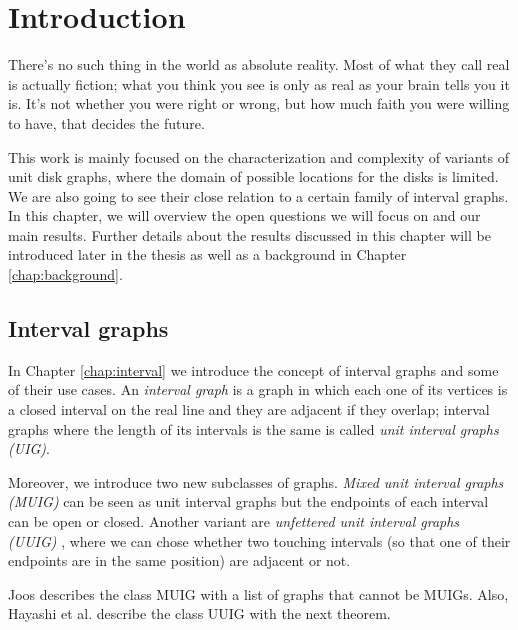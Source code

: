 \newtheorem*{_lemma}{Lemma}
\newtheorem*{_obs}{Observation}
\newtheorem*{_theo}{Theorem}

\chapter{Introduction}

\begin{fquote}
  There’s no such thing in the world as absolute reality. Most of what they call real is actually fiction; what you think you see is only as real as your brain tells you it is. It’s not whether you were right or wrong, but how much faith you were willing to have, that decides the future.
\end{fquote}


This work is mainly focused on the characterization and complexity of variants of unit disk graphs, where the domain of possible locations for the disks is limited. We are also going to see their close relation to a certain family of interval graphs. In this chapter, we will overview the open questions we will focus on and our main results. Further details about the results discussed in this chapter will be introduced later in the thesis as well as a background in Chapter \ref{chap:background}.

\section*{Interval graphs}

In Chapter \ref{chap:interval} we introduce the concept of interval graphs and some of their use cases. An \emph{interval graph} is a graph in which each one of its vertices is a closed interval on the real line and they are adjacent if they overlap; interval graphs where the length of its intervals is the same is called \emph{unit interval graphs (UIG)}.

Moreover, we introduce two new subclasses of graphs. \emph{Mixed unit interval graphs (MUIG)} \cite{joosCharacterizationMixedUnit2013} can be seen as unit interval graphs but the endpoints of each interval can be open or closed. Another variant are \emph{unfettered unit interval graphs (UUIG)} \cite{hayashiThinStripGraphs2017}, where we can chose whether two touching intervals (so that one of their endpoints are in the same position) are adjacent or not.

Joos describes the class MUIG \cite{joosCharacterizationMixedUnit2013} with a list of graphs that cannot be MUIGs. Also, Hayashi et al. describe the class UUIG with the next theorem.

